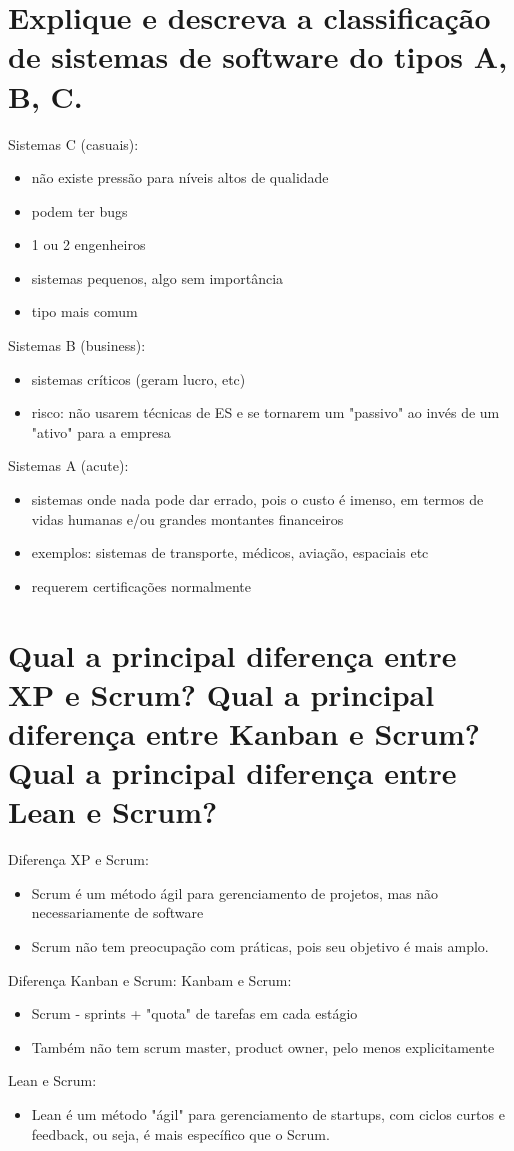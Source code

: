 \documentclass[11pt]{article}
\begin{document}
\section{Explique e descreva a classificação de sistemas de software do tipos A, B, C.}
\label{sec:org6e918fd}
Sistemas C (casuais): 
\begin{itemize}
\item não existe pressão para níveis altos de qualidade
\item podem ter bugs
\item 1 ou 2 engenheiros
\item sistemas pequenos, algo sem importância
\item tipo mais comum
\end{itemize}

Sistemas B (business):
\begin{itemize}
\item sistemas críticos (geram lucro, etc)
\item risco: não usarem técnicas de ES e se tornarem um "passivo" ao invés de um "ativo" para a empresa
\end{itemize}

Sistemas A (acute):
\begin{itemize}
\item sistemas onde nada pode dar errado, pois o custo é imenso, em termos de vidas humanas
e/ou grandes montantes financeiros
\item exemplos: sistemas de transporte, médicos, aviação, espaciais etc
\item requerem certificações normalmente
\end{itemize}


\section{Qual a principal diferença entre XP e Scrum? Qual a principal diferença entre Kanban e Scrum? Qual a principal diferença entre Lean e Scrum?}
\label{sec:org59e942b}
Diferença XP e Scrum:
\begin{itemize}
\item Scrum é um método ágil para gerenciamento de projetos, mas não necessariamente de
software
\item Scrum não tem preocupação com práticas, pois seu objetivo é mais amplo.
\end{itemize}
Diferença Kanban e Scrum:
Kanbam e Scrum:
\begin{itemize}
\item Scrum - sprints + "quota" de tarefas em cada estágio
\item Também não tem scrum master, product owner, pelo menos explicitamente
\end{itemize}
Lean e Scrum:
\begin{itemize}
\item Lean é um método "ágil" para gerenciamento de startups, com ciclos curtos e feedback,
ou seja, é mais específico que o Scrum.
\end{itemize}
\end{document}
